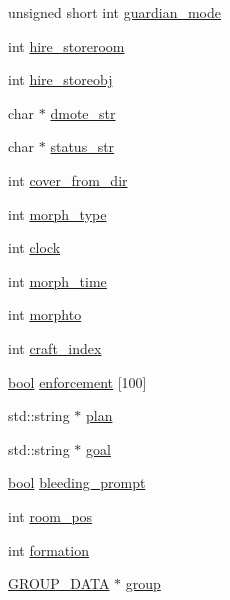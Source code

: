 \begin{DoxyCompactItemize}
unsigned short int \hyperlink{structchar__data_acc927dff260524dfe2d1c3aa03d50bbe}{guardian\-\_\-mode}
\item 
int \hyperlink{structchar__data_ad46ddde1a852c228de15de95f0de3c75}{hire\-\_\-storeroom}
\item 
int \hyperlink{structchar__data_a23cad8e203644f51119757334f4bdee3}{hire\-\_\-storeobj}
\item 
char $\ast$ \hyperlink{structchar__data_ab0cb76f57656dd43658c57df531e4909}{dmote\-\_\-str}
\item 
char $\ast$ \hyperlink{structchar__data_ab82112b1f66683c7cb9e4b179f130024}{status\-\_\-str}
\item 
int \hyperlink{structchar__data_a62aa4366178f94e076cb6cd675582827}{cover\-\_\-from\-\_\-dir}
\item 
int \hyperlink{structchar__data_a212312845f0361a710ecfe3109a5c2dc}{morph\-\_\-type}
\item 
int \hyperlink{structchar__data_a8ccd0ef401064315ddc7bf1341b5c8ca}{clock}
\item 
int \hyperlink{structchar__data_a5f7818c3273e045137f9c5d6cd77ac46}{morph\-\_\-time}
\item 
int \hyperlink{structchar__data_a23e3bdae1f1d30c8033fc7a7720ba2de}{morphto}
\item 
int \hyperlink{structchar__data_a8fde0f52ab2f67e0312518086a20715c}{craft\-\_\-index}
\item 
\hyperlink{structs_8h_ad5c9d4ba3dc37783a528b0925dc981a0}{bool} \hyperlink{structchar__data_a844301eaae89b0267693fa6837cae4fd}{enforcement} \mbox{[}100\mbox{]}
\item 
std\-::string $\ast$ \hyperlink{structchar__data_ab97679ebd920365337234d72006ff87e}{plan}
\item 
std\-::string $\ast$ \hyperlink{structchar__data_ac4261577d4f621e927d0ec1243c1253f}{goal}
\item 
\hyperlink{structs_8h_ad5c9d4ba3dc37783a528b0925dc981a0}{bool} \hyperlink{structchar__data_ab1c479546fbe29024d02cfa8724ee239}{bleeding\-\_\-prompt}
\item 
int \hyperlink{structchar__data_a16f2e5a250dcb85bf7ecc513c6356645}{room\-\_\-pos}
\item 
int \hyperlink{structchar__data_ab5831dabd736ba9be7a6ef131004cdba}{formation}
\item 
\hyperlink{structs_8h_a54e1bd3fdb91b0e02c8bc75fb49049f9}{G\-R\-O\-U\-P\-\_\-\-D\-A\-T\-A} $\ast$ \hyperlink{structchar__data_a4456209f640df5a6487031c9d3849844}{group}
\item 

\end{DoxyCompactItemize}
